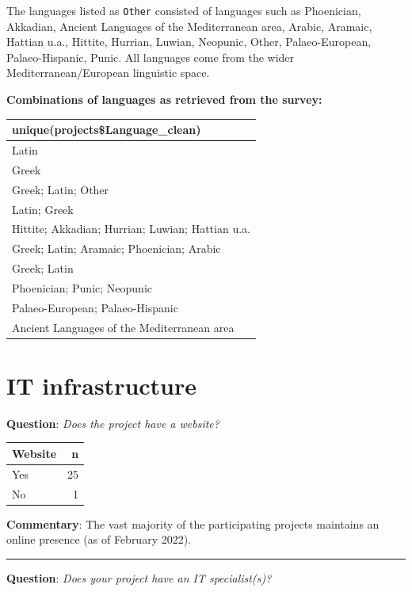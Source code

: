 \documentclass[
  12pt,
]{scrreprt}
\begin{document}
The languages listed as \texttt{Other} consisted of languages such as
Phoenician, Akkadian, Ancient Languages of the Mediterranean area,
Arabic, Aramaic, Hattian u.a., Hittite, Hurrian, Luwian, Neopunic,
Other, Palaeo-European, Palaeo-Hispanic, Punic. All languages come from
the wider Mediterranean/European linguistic space.

\textbf{Combinations of languages as retrieved from the survey:}

\begin{longtable}[]{@{}l@{}}
\toprule
unique(projects\$Language\_clean) \\
\midrule
\endhead
Latin \\
Greek \\
Greek; Latin; Other \\
Latin; Greek \\
Hittite; Akkadian; Hurrian; Luwian; Hattian u.a. \\
Greek; Latin; Aramaic; Phoenician; Arabic \\
Greek; Latin \\
Phoenician; Punic; Neopunic \\
Palaeo-European; Palaeo-Hispanic \\
Ancient Languages of the Mediterranean area \\
\bottomrule
\end{longtable}

\hypertarget{it-infrastructure-1}{%
\section{IT infrastructure}\label{it-infrastructure-1}}

\textbf{Question}: \emph{Does the project have a website?}

\begin{longtable}[]{@{}lr@{}}
\toprule
Website & n \\
\midrule
\endhead
Yes & 25 \\
No & 1 \\
\bottomrule
\end{longtable}

\textbf{Commentary}: The vast majority of the participating projects
maintains an online presence (as of February 2022).

\begin{center}\rule{0.5\linewidth}{0.5pt}\end{center}

\textbf{Question}: \emph{Does your project have an IT specialist(s)?}
\end{document}
